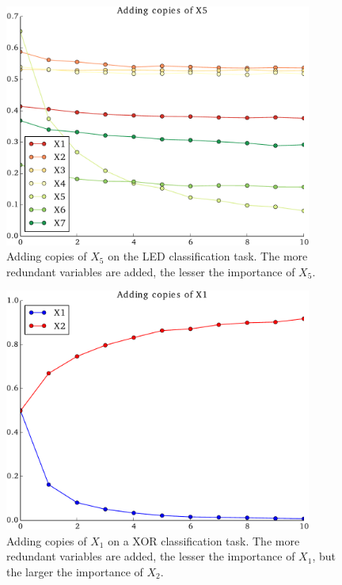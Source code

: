 \begin{figure}
\centering
\includegraphics[width=0.9\textwidth]{figures/ch7_red_led.pdf}
\caption{Adding copies of $X_5$ on the LED classification task. The more
         redundant variables are added, the lesser the importance of $X_5$.}
\label{fig:7:red:led}
\end{figure}


\begin{figure}
\centering
\includegraphics[width=0.9\textwidth]{figures/ch7_red_xor.pdf}
\caption{Adding copies of $X_1$ on a XOR classification task. The more redundant
         variables are added, the lesser the importance of $X_1$, but the larger
         the importance of $X_2$.}
\label{fig:7:red:xor}
\end{figure}

